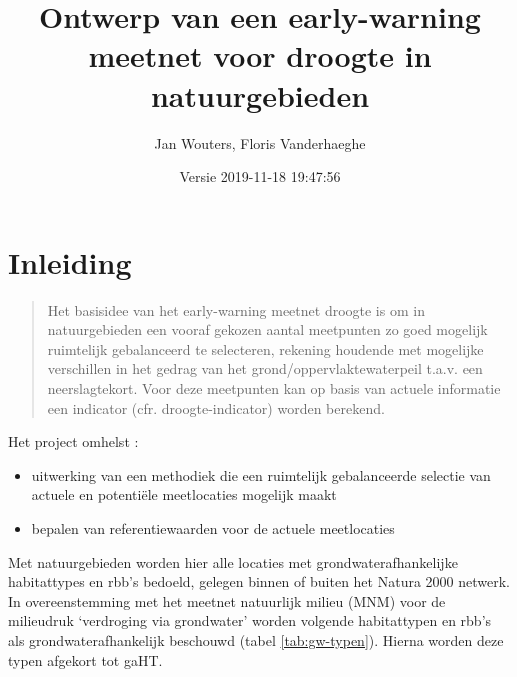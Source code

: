 \documentclass[11pt,]{book}
\title{Ontwerp van een early-warning meetnet voor droogte in natuurgebieden}
\author{Jan Wouters, Floris Vanderhaeghe}
\date{Versie 2019-11-18 19:47:56}
\providecommand{\tightlist}{%
  \setlength{\itemsep}{0pt}\setlength{\parskip}{0pt}}
\begin{document}
\maketitle

{
\hypersetup{linkcolor=black}
\setcounter{tocdepth}{2}
\tableofcontents
}
\chapter{Inleiding}\label{inleiding}

\begin{quote}
Het basisidee van het early-warning meetnet droogte is om in
natuurgebieden een vooraf gekozen aantal meetpunten zo goed mogelijk
ruimtelijk gebalanceerd te selecteren, rekening houdende met mogelijke
verschillen in het gedrag van het grond/oppervlaktewaterpeil t.a.v. een
neerslagtekort. Voor deze meetpunten kan op basis van actuele informatie
een indicator (cfr. droogte-indicator) worden berekend.
\end{quote}

Het project omhelst :

\begin{itemize}
\tightlist
\item
  uitwerking van een methodiek die een ruimtelijk gebalanceerde selectie
  van actuele en potentiële meetlocaties mogelijk maakt
\item
  bepalen van referentiewaarden voor de actuele meetlocaties
\end{itemize}

Met natuurgebieden worden hier alle locaties met grondwaterafhankelijke
habitattypes en rbb's bedoeld, gelegen binnen of buiten het Natura 2000
netwerk. In overeenstemming met het meetnet natuurlijk milieu (MNM) voor
de milieudruk `verdroging via grondwater' worden volgende habitattypen
en rbb's als grondwaterafhankelijk beschouwd (tabel \ref{tab:gw-typen}).
Hierna worden deze typen afgekort tot gaHT.
\end{document}
